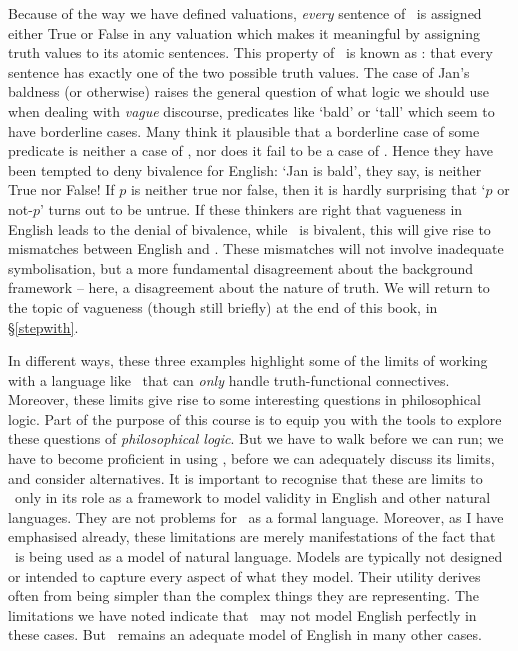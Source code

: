 Because of the way we have defined valuations, \emph{every} sentence of \TFL\ is assigned either True or False in any valuation which makes it meaningful by assigning truth values to its atomic sentences. This property of \TFL\ is known as : that every sentence has exactly one of the two possible truth values. The case of Jan's baldness (or otherwise) raises the general question of what logic we should use when dealing with \emph{vague} discourse, predicates like `bald' or `tall' which seem to have borderline cases. Many think it plausible that a borderline case of some predicate  is neither a case of , nor does it fail to be a case of . Hence they have been tempted to deny bivalence for English: `Jan is bald', they say, is neither True nor False! If $p$ is neither true nor false, then it is hardly surprising that `$p$ or not-$p$' turns out to be untrue. If these thinkers are right that vagueness in English leads to the denial of bivalence, while \TFL\ is bivalent, this will give rise to mismatches between English and \TFL. These mismatches will not involve inadequate symbolisation, but a more fundamental disagreement about the background framework – here, a disagreement about the nature of truth. We will return to the topic of vagueness (though still briefly) at the end of this book, in §\ref{stepwith}. 

In different ways, these three examples highlight some of the limits of working with a language like \TFL\ that can \emph{only} handle truth-functional connectives. Moreover, these limits give rise to some interesting questions in philosophical logic. Part of the purpose of this course is to equip you with the tools to explore these questions of \emph{philosophical logic}. But we have to walk before we can run; we have to become proficient in using \TFL, before we can adequately discuss its limits, and consider alternatives. It is important to recognise that these are limits to \TFL\ only in its role as a framework to model validity in English and other natural languages. They are not problems for \TFL\ as a formal language. Moreover, as I have emphasised already, these limitations are merely manifestations of the fact that \TFL\ is being used as a model of natural language. Models are typically not designed or intended to capture every aspect of what they model. Their utility derives often from being simpler than the complex things they are representing. The limitations we have noted indicate that \TFL\ may not model English perfectly in these cases. But \TFL\ remains an adequate model of English in many other cases.  



